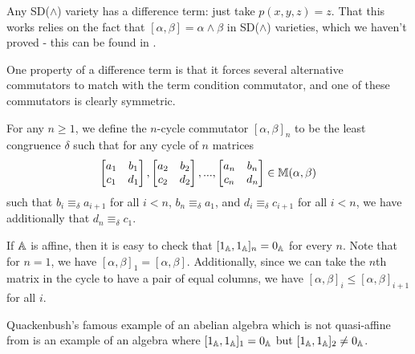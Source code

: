 \documentclass[letterpaper,11pt]{article}
\begin{document}
\begin{ex} Any SD($\wedge$) variety has a difference term: just take $p(x,y,z) = z$. That this works relies on the fact that $[\alpha,\beta] = \alpha\wedge\beta$ in SD($\wedge$) varieties, which we haven't proved - this can be found in \cite{kearnes-taylor-affine}.
\end{ex}

One property of a difference term is that it forces several alternative commutators to match with the term condition commutator, and one of these commutators is clearly symmetric.

\begin{defn} For any $n \ge 1$, we define the $n$-cycle commutator $[\alpha,\beta]_n$ to be the least congruence $\delta$ such that for any cycle of $n$ matrices
\[
\begin{bmatrix} a_1 & b_1\\ c_1 & d_1\end{bmatrix}, \begin{bmatrix} a_2 & b_2\\ c_2 & d_2\end{bmatrix}, ..., \begin{bmatrix} a_n & b_n\\ c_n & d_n\end{bmatrix} \in \mathbb{M}(\alpha,\beta)
\]
such that $b_i \equiv_\delta a_{i+1}$ for all $i < n$, $b_n \equiv_\delta a_1$, and $d_i \equiv_\delta c_{i+1}$ for all $i < n$, we have additionally that $d_n \equiv_\delta c_1$.
\end{defn}

If $\mathbb{A}$ is affine, then it is easy to check that $[1_{\mathbb{A}},1_{\mathbb{A}}]_n = 0_{\mathbb{A}}$ for every $n$. Note that for $n = 1$, we have $[\alpha,\beta]_1 = [\alpha,\beta]$. Additionally, since we can take the $n$th matrix in the cycle to have a pair of equal columns, we have $[\alpha,\beta]_i \le [\alpha,\beta]_{i+1}$ for all $i$.

Quackenbush's famous example of an abelian algebra which is not quasi-affine from \cite{quasi-affine-quackenbush} is an example of an algebra where $[1_{\mathbb{A}},1_{\mathbb{A}}]_1 = 0_{\mathbb{A}}$ but $[1_{\mathbb{A}},1_{\mathbb{A}}]_2 \ne 0_{\mathbb{A}}$.
\end{document}
